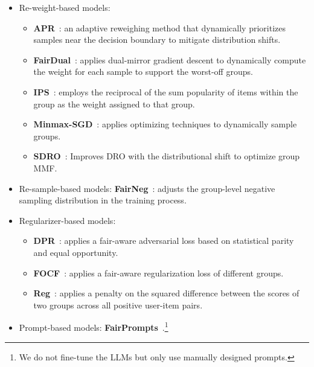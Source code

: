 \begin{itemize}[leftmargin=*]
    \item Re-weight-based models: 
    \begin{itemize}[leftmargin=*]
        \item \textbf{APR}~\cite{APR}: an adaptive reweighing method that dynamically prioritizes samples near the decision boundary to mitigate distribution shifts.
        \item \textbf{FairDual}~\cite{FairDual}: applies dual-mirror gradient descent to dynamically compute the weight for each sample to support the worst-off groups.
        \item \textbf{IPS}~\cite{jiang2024item}: employs the reciprocal of the sum popularity of items within the group as the weight assigned to that group.
        \item \textbf{Minmax-SGD}~\cite{Minmax-SGD}: applies optimizing techniques to dynamically sample groups.
        \item \textbf{SDRO}~\cite{SDRO}: Improves DRO with the distributional shift to optimize group MMF.
    \end{itemize}
   
    \item Re-sample-based models: \textbf{FairNeg}~\cite{FairNeg}: adjusts the group-level negative sampling distribution in the training process.
    \item Regularizer-based models: 
    \begin{itemize}[leftmargin=*]
        \item \textbf{DPR}~\cite{DPR}: applies a fair-aware adversarial loss based on statistical parity and equal opportunity.
        \item \textbf{FOCF}~\cite{yao2017beyond}: applies a fair-aware regularization loss of different groups.
        \item \textbf{Reg}~\cite{Reg}: applies a penalty on the squared difference between the scores of two groups across all positive user-item pairs.
    \end{itemize}
    
    \item Prompt-based models: \textbf{FairPrompts}~\cite{xu-etal-2024-study}.\footnote{We do not fine-tune the LLMs but only use manually designed prompts.}
\end{itemize}

